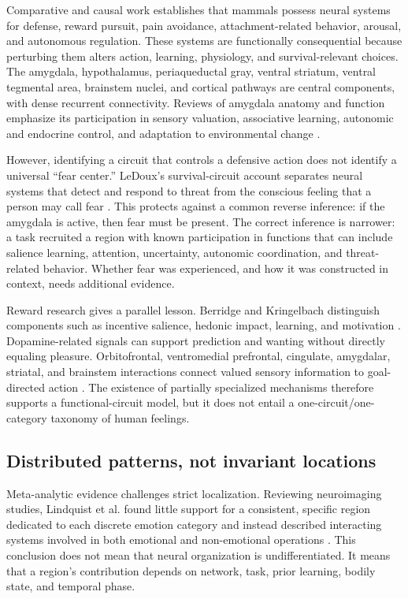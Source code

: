\documentclass[conference]{IEEEtran}
\begin{document}
Comparative and causal work establishes that mammals possess neural systems for defense, reward pursuit, pain avoidance, attachment-related behavior, arousal, and autonomous regulation. These systems are functionally consequential because perturbing them alters action, learning, physiology, and survival-relevant choices. The amygdala, hypothalamus, periaqueductal gray, ventral striatum, ventral tegmental area, brainstem nuclei, and cortical pathways are central components, with dense recurrent connectivity. Reviews of amygdala anatomy and function emphasize its participation in sensory valuation, associative learning, autonomic and endocrine control, and adaptation to environmental change \cite{Phelps2005,Simic2021}.

However, identifying a circuit that controls a defensive action does not identify a universal ``fear center.'' LeDoux's survival-circuit account separates neural systems that detect and respond to threat from the conscious feeling that a person may call fear \cite{LeDoux2012}. This protects against a common reverse inference: if the amygdala is active, then fear must be present. The correct inference is narrower: a task recruited a region with known participation in functions that can include salience learning, attention, uncertainty, autonomic coordination, and threat-related behavior. Whether fear was experienced, and how it was constructed in context, needs additional evidence.

Reward research gives a parallel lesson. Berridge and Kringelbach distinguish components such as incentive salience, hedonic impact, learning, and motivation \cite{Berridge2008}. Dopamine-related signals can support prediction and wanting without directly equaling pleasure. Orbitofrontal, ventromedial prefrontal, cingulate, amygdalar, striatal, and brainstem interactions connect valued sensory information to goal-directed action \cite{Rolls2023}. The existence of partially specialized mechanisms therefore supports a functional-circuit model, but it does not entail a one-circuit/one-category taxonomy of human feelings.

\subsection{Distributed patterns, not invariant locations}

Meta-analytic evidence challenges strict localization. Reviewing neuroimaging studies, Lindquist et al. found little support for a consistent, specific region dedicated to each discrete emotion category and instead described interacting systems involved in both emotional and non-emotional operations \cite{Lindquist2012}. This conclusion does not mean that neural organization is undifferentiated. It means that a region's contribution depends on network, task, prior learning, bodily state, and temporal phase.
\end{document}
